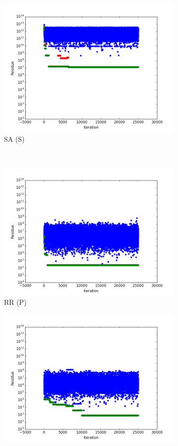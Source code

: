 \documentclass[12pt]{article}
\begin{document}
\begin{figure}[h]
\begin{center}
\begin{subfigure}[t]{0.3\textwidth}
\includegraphics[width=\textwidth]{img/sas.png}
\caption{SA (S)}
\end{subfigure}\\
\begin{subfigure}[t]{0.3\textwidth}
\includegraphics[width=\textwidth]{img/rrp.png}
\caption{RR (P)}
\end{subfigure}
\begin{subfigure}[t]{0.3\textwidth}
\includegraphics[width=\textwidth]{img/hcp.png}

\end{subfigure}
\end{center}
\end{figure}
\end{document}
